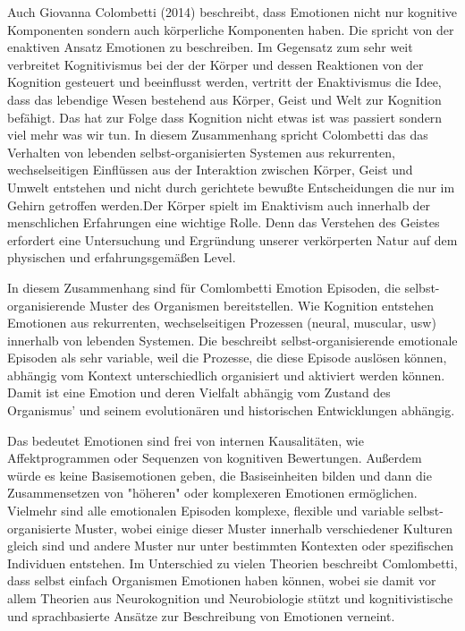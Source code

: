 Auch Giovanna Colombetti (2014) beschreibt, dass Emotionen nicht nur kognitive Komponenten sondern auch körperliche Komponenten haben. Die spricht von der enaktiven Ansatz Emotionen zu beschreiben. Im Gegensatz zum sehr weit verbreitet Kognitivismus bei der der Körper und dessen Reaktionen von der Kognition gesteuert und beeinflusst werden, vertritt der Enaktivismus die Idee, dass das lebendige Wesen bestehend aus Körper, Geist und Welt zur Kognition befähigt. Das hat zur Folge dass Kognition nicht etwas ist was passiert sondern viel mehr was wir tun. In diesem Zusammenhang spricht Colombetti das das Verhalten von lebenden selbst-organisierten Systemen aus rekurrenten, wechselseitigen Einflüssen aus der Interaktion zwischen Körper, Geist und Umwelt entstehen und nicht durch gerichtete bewußte Entscheidungen die nur im Gehirn getroffen werden.Der Körper spielt im Enaktivism auch innerhalb der menschlichen Erfahrungen eine wichtige Rolle. Denn das Verstehen des Geistes erfordert eine Untersuchung und Ergründung unserer verkörperten Natur auf dem physischen und erfahrungsgemäßen Level. 

In diesem Zusammenhang sind für Comlombetti Emotion Episoden, die selbst-organisierende Muster des Organismen bereitstellen. Wie Kognition entstehen Emotionen aus rekurrenten, wechselseitigen Prozessen (neural, muscular, usw) innerhalb von lebenden Systemen. Die beschreibt selbst-organisierende emotionale Episoden als sehr variable, weil die Prozesse, die diese Episode auslösen können, abhängig vom Kontext unterschiedlich organisiert und aktiviert werden können. Damit ist eine Emotion und deren Vielfalt abhängig vom Zustand des Organismus' und seinem evolutionären und historischen Entwicklungen abhängig.

Das bedeutet Emotionen sind frei von internen Kausalitäten, wie Affektprogrammen oder Sequenzen von kognitiven Bewertungen. Außerdem würde es keine Basisemotionen geben, die Basiseinheiten bilden und dann die Zusammensetzen von "höheren" oder komplexeren Emotionen ermöglichen. Vielmehr sind alle emotionalen Episoden komplexe, flexible und variable selbst-organisierte Muster, wobei einige dieser Muster innerhalb verschiedener Kulturen gleich sind und andere Muster nur unter bestimmten Kontexten oder spezifischen Individuen entstehen. Im Unterschied zu vielen Theorien beschreibt Comlombetti, dass selbst einfach Organismen Emotionen haben können, wobei sie damit vor allem Theorien aus Neurokognition und Neurobiologie stützt und kognitivistische und sprachbasierte Ansätze zur Beschreibung von Emotionen verneint.


